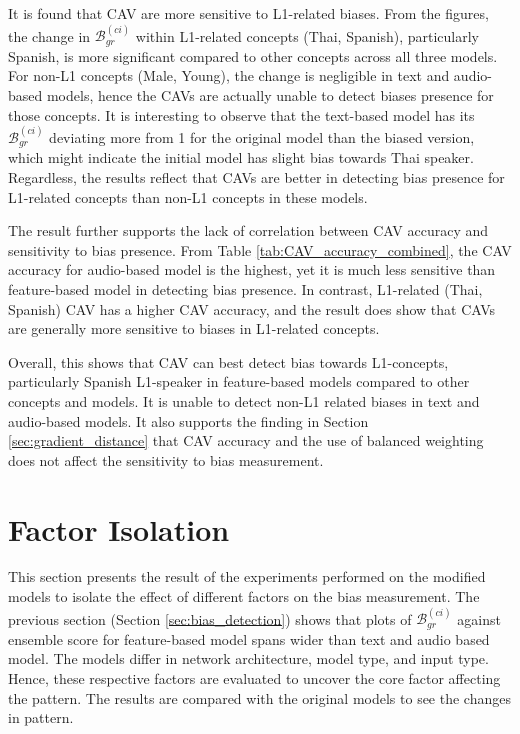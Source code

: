 It is found that CAV are more sensitive to L1-related biases. From the figures, the change in $\mathcal{B}^{(ci)}_{gr}$ within L1-related concepts (Thai, Spanish), particularly Spanish, is more significant compared to other concepts across all three models. For non-L1 concepts (Male, Young), the change is negligible in text and audio-based models, hence the CAVs are actually unable to detect biases presence for those concepts. It is interesting to observe that the text-based model has its $\mathcal{B}^{(ci)}_{gr}$ deviating more from 1 for the original model than the biased version, which might indicate the initial model has slight bias towards Thai speaker. Regardless, the results reflect that CAVs are better in detecting bias presence for L1-related concepts than non-L1 concepts in these models.

The result further supports the lack of correlation between CAV accuracy and sensitivity to bias presence. From Table \ref{tab:CAV_accuracy_combined}, the CAV accuracy for audio-based model is the highest, yet it is much less sensitive than feature-based model in detecting bias presence. In contrast, L1-related (Thai, Spanish) CAV has a higher CAV accuracy, and the result does show that CAVs are generally more sensitive to biases in L1-related concepts.

Overall, this shows that CAV can best detect bias towards L1-concepts, particularly Spanish L1-speaker in feature-based models compared to other concepts and models. It is unable to detect non-L1 related biases in text and audio-based models. It also supports the finding in Section \ref{sec:gradient_distance} that CAV accuracy and the use of balanced weighting does not affect the sensitivity to bias measurement.

\section{Factor Isolation} \label{sec:factor_isolation}
This section presents the result of the experiments performed on the modified models to isolate the effect of different factors on the bias measurement. The previous section (Section \ref{sec:bias_detection}) shows that plots of $\mathcal{B}^{(ci)}_{gr}$ against ensemble score for feature-based model spans wider than text and audio based model. The models differ in network architecture, model type, and input type. Hence, these respective factors are evaluated to uncover the core factor affecting the pattern. The results are compared with the original models to see the changes in pattern.

